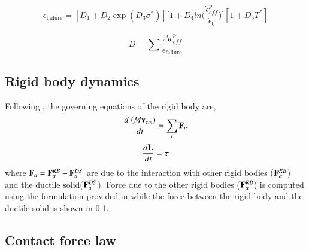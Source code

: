 \begin{equation}
  \epsilon_{\text{failure}} = [D_1 + D_2 \exp(D_3 \sigma^{*})]
  \bigg[ 1 + D_4 ln\big(\frac{\dot{\epsilon}_{eff}^p}{\dot{\epsilon}_{0}})\bigg]
  [1 + D_5 T^*]
\end{equation}

\begin{equation}
  D = \sum\frac{\Delta \epsilon_{eff}^p}{\epsilon_{\text{failure}}}
\end{equation}



\subsection{Rigid body dynamics}
\label{chap-erosion:sec:rigid-body-dynamics}
Following \cite{chap-rfc}, the governing equations of the rigid body are,
\begin{equation}
  \label{eq:balance_linear_mom}
  \frac{d \; (M \mathbf{v}_{cm})}{d t} = \sum_i \mathbf{F}_i,
\end{equation}
\begin{equation}
  \label{eq:balance_angular_mom}
  \frac{d \mathbf{L}}{d t} = \boldsymbol{\tau}
\end{equation}
where $\mathbf{F}_a = \mathbf{F}^{RB}_a + \mathbf{F}^{DS}_a$ are due to the interaction
with other rigid bodies ($\mathbf{F}^{RB}_a$) and the ductile
solid($\mathbf{F}^{DS}_a$). Force due to the other rigid bodies ($\mathbf{F}^{RB}_a$)
is computed using the formulation provided in \cite{sec:rfc:contact force} while
the force between the rigid body and the ductile solid is shown in
\cref{chap-erosion:sec:rigid-body-dynamics}.


\subsection{Contact force law}
\label{chap-erosion:sec:rigid-body-collision}

